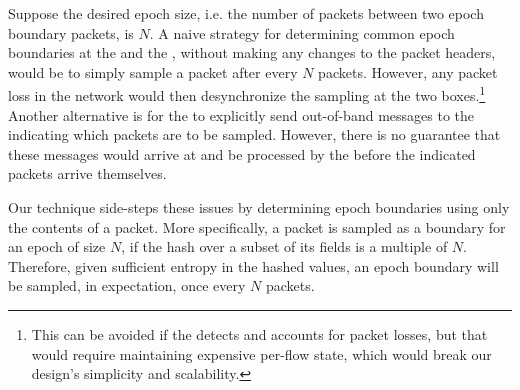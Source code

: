 Suppose the desired epoch size, i.e. the number of packets between two epoch boundary packets, is $N$. A naive strategy for determining common epoch boundaries at the \inbox and the \outbox, without making any changes to the packet headers, would be to simply sample a packet after every $N$ packets. However, any packet loss in the network would then desynchronize the sampling at the two boxes.\footnote{This can be avoided if the \outbox detects and accounts for packet losses, but that would require maintaining expensive per-flow state, which would break our design's simplicity and scalability.} Another alternative is for the \inbox to explicitly send out-of-band messages to the \outbox indicating which packets are to be sampled. However, there is no guarantee that these messages would arrive at and be processed by the \outbox before the indicated packets arrive themselves. 

Our technique side-steps these issues by determining epoch boundaries using only the contents of a packet. More specifically, a packet is sampled as a boundary for an epoch of size $N$, if the hash over a subset of its fields is a multiple of $N$. Therefore, given sufficient entropy in the hashed values, an epoch boundary will be sampled, in expectation, once every $N$ packets.

